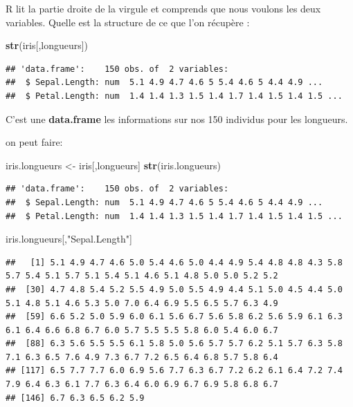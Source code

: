 \documentclass[
]{book}
\newenvironment{Shaded}{\begin{snugshade}}{\end{snugshade}}
\newcommand{\FunctionTok}[1]{\textcolor[rgb]{0.13,0.29,0.53}{\textbf{#1}}}
\newcommand{\NormalTok}[1]{#1}
\newcommand{\OtherTok}[1]{\textcolor[rgb]{0.56,0.35,0.01}{#1}}
\newcommand{\StringTok}[1]{\textcolor[rgb]{0.31,0.60,0.02}{#1}}
\begin{document}
R lit la partie droite de la virgule et comprends que nous voulons les deux variables.
Quelle est la structure de ce que l'on récupère :

\begin{Shaded}
\begin{Highlighting}[]
\FunctionTok{str}\NormalTok{(iris[,longueurs])}
\end{Highlighting}
\end{Shaded}

\begin{verbatim}
## 'data.frame':    150 obs. of  2 variables:
##  $ Sepal.Length: num  5.1 4.9 4.7 4.6 5 5.4 4.6 5 4.4 4.9 ...
##  $ Petal.Length: num  1.4 1.4 1.3 1.5 1.4 1.7 1.4 1.5 1.4 1.5 ...
\end{verbatim}

C'est une \textbf{data.frame} les informations sur nos 150 individus pour les longueurs.

on peut faire:

\begin{Shaded}
\begin{Highlighting}[]
\NormalTok{iris.longueurs }\OtherTok{\textless{}{-}}\NormalTok{ iris[,longueurs]}
\FunctionTok{str}\NormalTok{(iris.longueurs)}
\end{Highlighting}
\end{Shaded}

\begin{verbatim}
## 'data.frame':    150 obs. of  2 variables:
##  $ Sepal.Length: num  5.1 4.9 4.7 4.6 5 5.4 4.6 5 4.4 4.9 ...
##  $ Petal.Length: num  1.4 1.4 1.3 1.5 1.4 1.7 1.4 1.5 1.4 1.5 ...
\end{verbatim}

\begin{Shaded}
\begin{Highlighting}[]
\NormalTok{iris.longueurs[,}\StringTok{"Sepal.Length"}\NormalTok{]}
\end{Highlighting}
\end{Shaded}

\begin{verbatim}
##   [1] 5.1 4.9 4.7 4.6 5.0 5.4 4.6 5.0 4.4 4.9 5.4 4.8 4.8 4.3 5.8 5.7 5.4 5.1 5.7 5.1 5.4 5.1 4.6 5.1 4.8 5.0 5.0 5.2 5.2
##  [30] 4.7 4.8 5.4 5.2 5.5 4.9 5.0 5.5 4.9 4.4 5.1 5.0 4.5 4.4 5.0 5.1 4.8 5.1 4.6 5.3 5.0 7.0 6.4 6.9 5.5 6.5 5.7 6.3 4.9
##  [59] 6.6 5.2 5.0 5.9 6.0 6.1 5.6 6.7 5.6 5.8 6.2 5.6 5.9 6.1 6.3 6.1 6.4 6.6 6.8 6.7 6.0 5.7 5.5 5.5 5.8 6.0 5.4 6.0 6.7
##  [88] 6.3 5.6 5.5 5.5 6.1 5.8 5.0 5.6 5.7 5.7 6.2 5.1 5.7 6.3 5.8 7.1 6.3 6.5 7.6 4.9 7.3 6.7 7.2 6.5 6.4 6.8 5.7 5.8 6.4
## [117] 6.5 7.7 7.7 6.0 6.9 5.6 7.7 6.3 6.7 7.2 6.2 6.1 6.4 7.2 7.4 7.9 6.4 6.3 6.1 7.7 6.3 6.4 6.0 6.9 6.7 6.9 5.8 6.8 6.7
## [146] 6.7 6.3 6.5 6.2 5.9
\end{verbatim}
\end{document}
